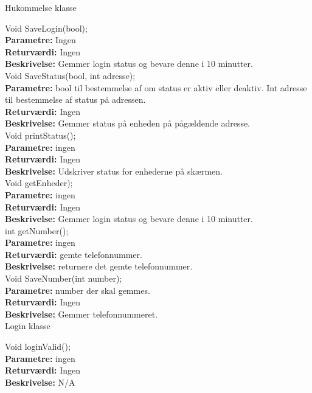 {\centering Hukommelse klasse}

Void SaveLogin(bool); \\
\textbf{Parametre:} Ingen \\
\textbf{Returværdi:} Ingen \\
\textbf{Beskrivelse:} Gemmer login status og bevare denne i 10 minutter. \\

Void SaveStatus(bool, int adresse); \\
\textbf{Parametre:} bool til bestemmelse af om status er aktiv eller deaktiv. Int adresse til bestemmelse af status på adressen. \\
\textbf{Returværdi:} Ingen \\
\textbf{Beskrivelse:} Gemmer status på enheden på pågældende adresse. \\

Void printStatus(); \\
\textbf{Parametre:} ingen \\
\textbf{Returværdi:} Ingen \\
\textbf{Beskrivelse:} Udskriver status for enhederne på skærmen. \\

Void getEnheder); \\
\textbf{Parametre:} ingen \\
\textbf{Returværdi:} Ingen \\
\textbf{Beskrivelse:} Gemmer login status og bevare denne i 10 minutter. \\

int getNumber(); \\
\textbf{Parametre:} ingen \\
\textbf{Returværdi:} gemte telefonnummer. \\
\textbf{Beskrivelse:} returnere det gemte telefonnummer. \\

Void SaveNumber(int number); \\
\textbf{Parametre:} number der skal gemmes. \\
\textbf{Returværdi:} Ingen \\
\textbf{Beskrivelse:} Gemmer telefonnummeret. \\

{\centering Login klasse}

Void loginValid(); \\
\textbf{Parametre:} ingen  \\
\textbf{Returværdi:} Ingen \\
\textbf{Beskrivelse:} N/A \\

